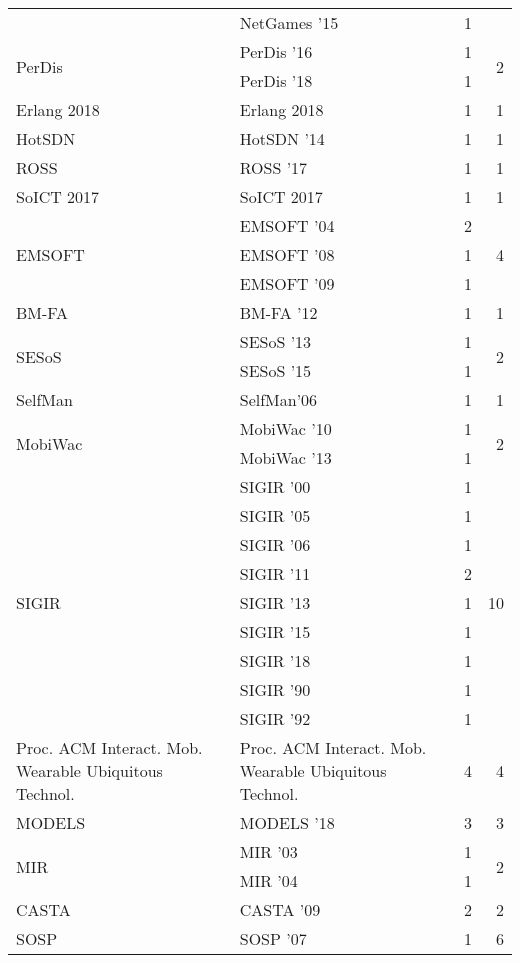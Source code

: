 \begin{table*}[t]
\begin{tabular}{llrr}
& NetGames '15 & 1 &\\
\multirow{2}{*}{PerDis } & PerDis '16 & 1 & \multirow{2}{*}{2}\\
& PerDis '18 & 1 &\\
\multirow{1}{*}{Erlang 2018} & Erlang 2018 & 1 & \multirow{1}{*}{1}\\
\multirow{1}{*}{HotSDN } & HotSDN '14 & 1 & \multirow{1}{*}{1}\\
\multirow{1}{*}{ROSS } & ROSS '17 & 1 & \multirow{1}{*}{1}\\
\multirow{1}{*}{SoICT 2017} & SoICT 2017 & 1 & \multirow{1}{*}{1}\\
\multirow{3}{*}{EMSOFT } & EMSOFT '04 & 2 & \multirow{3}{*}{4}\\
& EMSOFT '08 & 1 &\\
& EMSOFT '09 & 1 &\\
\multirow{1}{*}{BM-FA } & BM-FA '12 & 1 & \multirow{1}{*}{1}\\
\multirow{2}{*}{SESoS } & SESoS '13 & 1 & \multirow{2}{*}{2}\\
& SESoS '15 & 1 &\\
\multirow{1}{*}{SelfMan} & SelfMan'06 & 1 & \multirow{1}{*}{1}\\
\multirow{2}{*}{MobiWac } & MobiWac '10 & 1 & \multirow{2}{*}{2}\\
& MobiWac '13 & 1 &\\
\multirow{9}{*}{SIGIR } & SIGIR '00 & 1 & \multirow{9}{*}{10}\\
& SIGIR '05 & 1 &\\
& SIGIR '06 & 1 &\\
& SIGIR '11 & 2 &\\
& SIGIR '13 & 1 &\\
& SIGIR '15 & 1 &\\
& SIGIR '18 & 1 &\\
& SIGIR '90 & 1 &\\
& SIGIR '92 & 1 &\\
\multirow{1}{*}{Proc. ACM Interact. Mob. Wearable Ubiquitous Technol.} & Proc. ACM Interact. Mob. Wearable Ubiquitous Technol. & 4 & \multirow{1}{*}{4}\\
\multirow{1}{*}{MODELS } & MODELS '18 & 3 & \multirow{1}{*}{3}\\
\multirow{2}{*}{MIR } & MIR '03 & 1 & \multirow{2}{*}{2}\\
& MIR '04 & 1 &\\
\multirow{1}{*}{CASTA } & CASTA '09 & 2 & \multirow{1}{*}{2}\\
\multirow{4}{*}{SOSP } & SOSP '07 & 1 & \multirow{4}{*}{6}\\

\end{tabular}
\end{table*}
